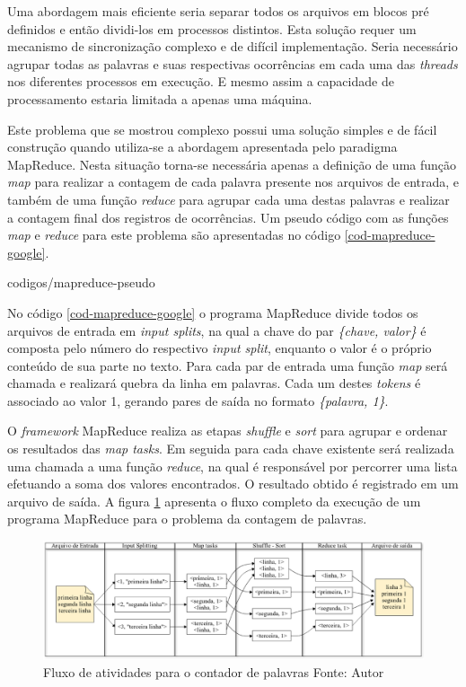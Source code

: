Uma abordagem mais eficiente seria separar todos os arquivos em blocos pré definidos e então dividi-los em processos distintos. Esta solução requer um mecanismo de sincronização complexo e de difícil implementação. Seria necessário agrupar todas as palavras e suas respectivas ocorrências em cada uma das \textit{threads} nos diferentes processos em execução. E mesmo assim a capacidade de processamento estaria limitada a apenas uma máquina.

Este problema que se mostrou complexo possui uma solução simples e de fácil construção quando utiliza-se a abordagem apresentada pelo paradigma MapReduce. Nesta situação torna-se necessária apenas a definição de uma função \textit{map} para realizar a contagem de cada palavra presente nos arquivos de entrada, e também de uma função \textit{reduce} para agrupar cada uma destas palavras e realizar a contagem final dos registros de ocorrências. Um pseudo código com as funções \textit{map} e \textit{reduce} para este problema são apresentadas no código \ref{cod-mapreduce-google}.


		{codigos/mapreduce-pseudo}
\FloatBarrier

No código \ref{cod-mapreduce-google} o programa MapReduce divide todos os arquivos de entrada em \textit{input splits}, na qual a chave do par \textit{\{chave, valor\}} é composta pelo número do respectivo \textit{input split}, enquanto o valor é o próprio conteúdo de sua parte no texto. Para cada par de entrada uma função \textit{map} será chamada e realizará quebra da linha em palavras. Cada um destes \textit{tokens} é associado ao valor 1, gerando pares de saída no formato \textit{\{palavra, 1\}}.

O \textit{framework} MapReduce realiza as etapas \textit{shuffle} e \textit{sort} para agrupar e ordenar os resultados das \textit{map tasks}. Em seguida para cada chave existente será realizada uma chamada a uma função \textit{reduce}, na qual é responsável por percorrer uma lista efetuando a soma dos valores encontrados. O resultado obtido é registrado em um arquivo de saída. A figura \ref{fig-mapreduce-word-count} apresenta o fluxo completo da execução de um programa MapReduce para o problema da contagem de palavras.

\begin{figure}[ht!]
	\centering
	\includegraphics[keepaspectratio=true,scale=0.36]
	  {figuras/mapreduce-word-count.eps}
	\caption[Fluxo de atividades para o contador de palavras]{Fluxo de atividades para o contador de palavras
	\protect\linebreak Fonte: Autor}
	\label{fig-mapreduce-word-count}
\end{figure}
\FloatBarrier

